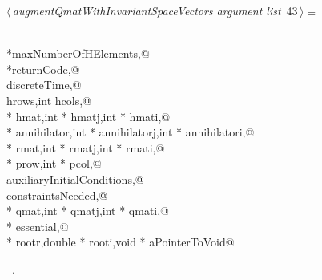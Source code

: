 \documentclass{article}
\begin{document}
\begin{flushleft} \small
\begin{minipage}{\linewidth}\label{scrap57}\raggedright\small
{} $\langle\,${\itshape augmentQmatWithInvariantSpaceVectors argument list}\nobreak\ {\footnotesize {43}}$\,\rangle\equiv$
\vspace{-1ex}
\begin{list}{}{} \item
\mbox{}\verb@@\\
\mbox{}\verb@int *maxNumberOfHElements,@\\
\mbox{}\verb@int *returnCode,@\\
\mbox{}\verb@int discreteTime,@\\
\mbox{}\verb@int hrows,int hcols,@\\
\mbox{}\verb@double * hmat,int * hmatj,int * hmati,@\\
\mbox{}\verb@double * annihilator,int * annihilatorj,int * annihilatori,@\\
\mbox{}\verb@double * rmat,int * rmatj,int * rmati,@\\
\mbox{}\verb@int * prow,int * pcol,@\\
\mbox{}\verb@int auxiliaryInitialConditions,@\\
\mbox{}\verb@int constraintsNeeded,@\\
\mbox{}\verb@double * qmat,int * qmatj,int * qmati,@\\
\mbox{}\verb@int * essential,@\\
\mbox{}\verb@double * rootr,double * rooti,void * aPointerToVoid@\\
\mbox{}\verb@@{\NWsep}
\end{list}
\vspace{-1.5ex}
\footnotesize
\begin{list}{}{\setlength{\itemsep}{-\parsep}\setlength{\itemindent}{-\leftmargin}}
\item \NWtxtMacroRefIn\ .

\end{list}
\end{minipage}
\end{flushleft}
\end{document}
